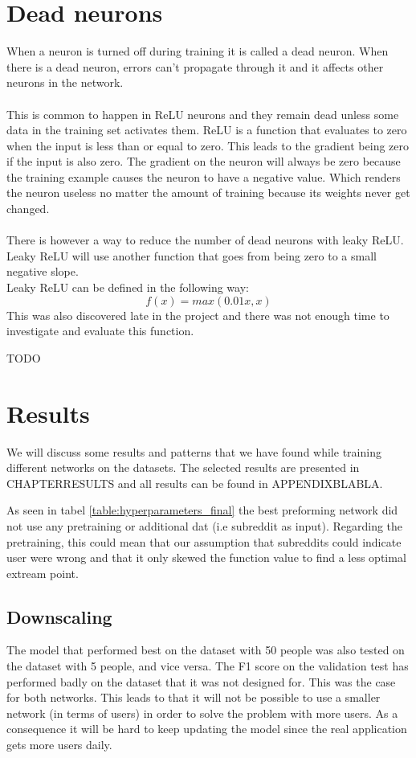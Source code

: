 \section{Dead neurons}
When a neuron is turned off during training it is called a dead neuron. When there is a dead neuron, errors can't propagate through it and it affects other neurons in the network.\\\\
This is common to happen in ReLU neurons and they remain dead unless some data in the training set activates them. ReLU is a function that evaluates to zero when the input is less than or equal to zero. This leads to the gradient being zero if the input is also zero. The gradient on the neuron will always be zero because the training example causes the neuron to have a negative value. Which renders the neuron useless no matter the amount of training because its weights never get changed.\\\\
There is however a way to reduce the number of dead neurons with leaky ReLU. Leaky ReLU will use another function that goes from being zero to a small negative slope.\parencite{maas2013rectifier} \\
Leaky ReLU can be defined in the following way:\\
\begin{equation}
    f(x)=max(0.01x,x)
\end{equation}
This was also discovered late in the project and there was not enough time to investigate and evaluate this function.



TODO



\section{Results}
We will discuss some results and patterns that we have found while training different networks on the datasets. The selected results are presented in CHAPTERRESULTS and all results can be found in APPENDIXBLABLA.

As seen in tabel \ref{table:hyperparameters_final} the best preforming network did not use any pretraining or additional dat (i.e subreddit as input). Regarding the pretraining, this could mean that our assumption that subreddits could indicate user were wrong and that it only skewed the function value to find a less optimal extream point. 

\subsection{Downscaling}
The model that performed best on the dataset with 50 people was also tested on the dataset with 5 people, and vice versa. The F1 score on the validation test has performed badly on the dataset that it was not designed for.
This was the case for both networks. This leads to that it will not be possible to use a smaller network (in terms of users) in order to solve the problem with more users. As a consequence it will be hard to keep updating the model since the real application gets more users daily. 

